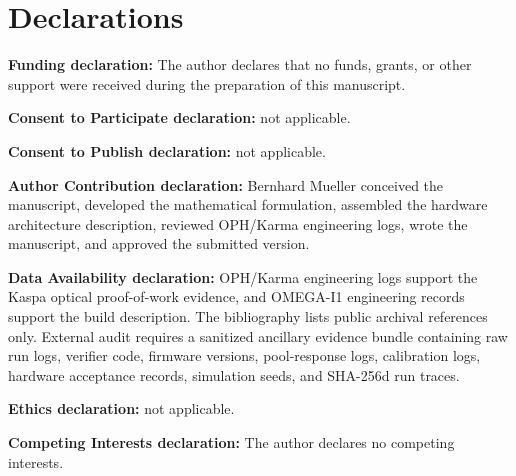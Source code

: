 \documentclass[11pt]{article}
\theoremstyle{definition}
\theoremstyle{remark}
\begin{document}
\section*{Declarations}

\noindent\textbf{Funding declaration:} The author declares that no funds,
grants, or other support were received during the preparation of this
manuscript.

\noindent\textbf{Consent to Participate declaration:} not applicable.

\noindent\textbf{Consent to Publish declaration:} not applicable.

\noindent\textbf{Author Contribution declaration:} Bernhard Mueller conceived
the manuscript, developed the mathematical formulation, assembled the hardware
architecture description, reviewed OPH/Karma engineering logs, wrote
the manuscript, and approved the submitted version.

\noindent\textbf{Data Availability declaration:} OPH/Karma engineering logs
support the Kaspa optical proof-of-work evidence, and OMEGA-I1 engineering
records support the build description. The bibliography lists public archival
references only. External audit requires a sanitized ancillary evidence bundle
containing raw run logs, verifier code, firmware versions, pool-response logs,
calibration logs, hardware acceptance records, simulation seeds, and SHA-256d
run traces.

\noindent\textbf{Ethics declaration:} not applicable.

\noindent\textbf{Competing Interests declaration:} The author declares no
competing interests.
\end{document}
